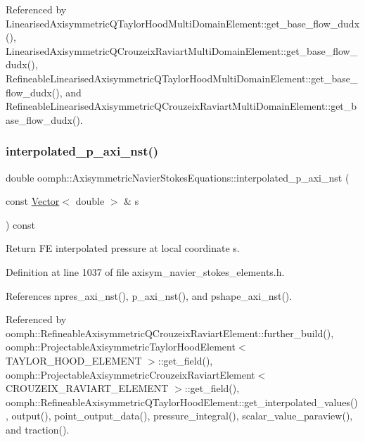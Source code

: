 Referenced by Linearised\+Axisymmetric\+Q\+Taylor\+Hood\+Multi\+Domain\+Element\+::get\+\_\+base\+\_\+flow\+\_\+dudx(), Linearised\+Axisymmetric\+Q\+Crouzeix\+Raviart\+Multi\+Domain\+Element\+::get\+\_\+base\+\_\+flow\+\_\+dudx(), Refineable\+Linearised\+Axisymmetric\+Q\+Taylor\+Hood\+Multi\+Domain\+Element\+::get\+\_\+base\+\_\+flow\+\_\+dudx(), and Refineable\+Linearised\+Axisymmetric\+Q\+Crouzeix\+Raviart\+Multi\+Domain\+Element\+::get\+\_\+base\+\_\+flow\+\_\+dudx().

\mbox{\label{classoomph_1_1AxisymmetricNavierStokesEquations_ab355488fd99663f08df3aa24d8a8eec4}} 
\subsubsection{\texorpdfstring{interpolated\+\_\+p\+\_\+axi\+\_\+nst()}{interpolated\_p\_axi\_nst()}}
{\footnotesize\ttfamily double oomph\+::\+Axisymmetric\+Navier\+Stokes\+Equations\+::interpolated\+\_\+p\+\_\+axi\+\_\+nst (\begin{DoxyParamCaption}\item[{const \hyperlink{classoomph_1_1Vector}{Vector}$<$ double $>$ \&}]{s }\end{DoxyParamCaption}) const\hspace{0.3cm}{\ttfamily [inline]}}



Return FE interpolated pressure at local coordinate s. 



Definition at line 1037 of file axisym\+\_\+navier\+\_\+stokes\+\_\+elements.\+h.



References npres\+\_\+axi\+\_\+nst(), p\+\_\+axi\+\_\+nst(), and pshape\+\_\+axi\+\_\+nst().



Referenced by oomph\+::\+Refineable\+Axisymmetric\+Q\+Crouzeix\+Raviart\+Element\+::further\+\_\+build(), oomph\+::\+Projectable\+Axisymmetric\+Taylor\+Hood\+Element$<$ T\+A\+Y\+L\+O\+R\+\_\+\+H\+O\+O\+D\+\_\+\+E\+L\+E\+M\+E\+N\+T $>$\+::get\+\_\+field(), oomph\+::\+Projectable\+Axisymmetric\+Crouzeix\+Raviart\+Element$<$ C\+R\+O\+U\+Z\+E\+I\+X\+\_\+\+R\+A\+V\+I\+A\+R\+T\+\_\+\+E\+L\+E\+M\+E\+N\+T $>$\+::get\+\_\+field(), oomph\+::\+Refineable\+Axisymmetric\+Q\+Taylor\+Hood\+Element\+::get\+\_\+interpolated\+\_\+values(), output(), point\+\_\+output\+\_\+data(), pressure\+\_\+integral(), scalar\+\_\+value\+\_\+paraview(), and traction().

